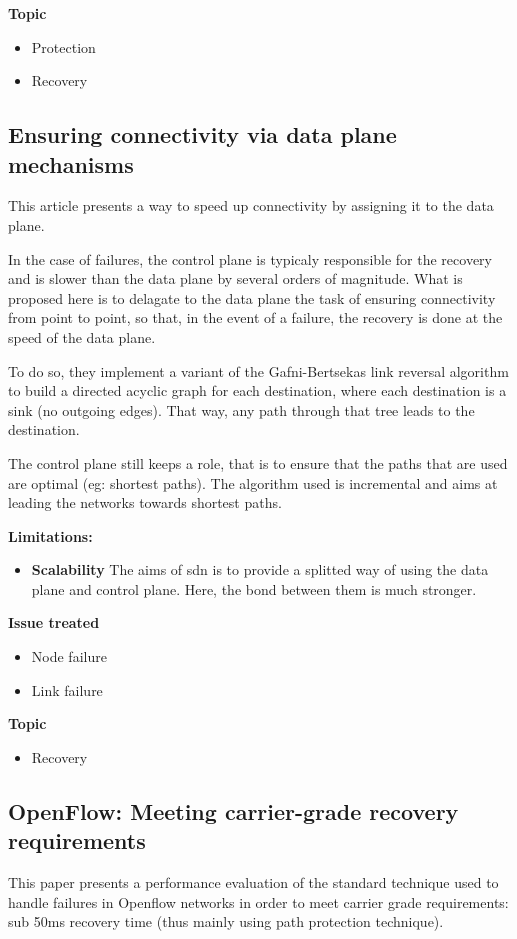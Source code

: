 \documentclass[compsoc]{IEEEtran}
\begin{document}
\textbf{Topic}
\begin{itemize}
	\item Protection
	\item Recovery
\end{itemize}

\subsection{Ensuring connectivity via data plane mechanisms \cite{Liu:2013:ECV:2482626.2482639}}
This article presents a way to speed up connectivity by assigning it to the data plane.

In the case of failures, the control plane is typicaly responsible for the recovery and is slower than the data plane by several orders of magnitude. What is proposed here is to delagate to the data plane the task of ensuring connectivity from point to point, so that, in the event of a failure, the recovery is done at the speed of the data plane.

To do so, they implement a variant of the Gafni-Bertsekas link reversal algorithm to build a directed acyclic graph for each destination, where each destination is a sink (no outgoing edges). That way, any path through that tree leads to the destination.

The control plane still keeps a role, that is to ensure that the paths that are used are optimal (eg: shortest paths). The algorithm used is incremental and aims at leading the networks towards shortest paths.

\textbf{Limitations:}
\begin{itemize}
	\item \textbf{Scalability} The aims of sdn is to provide a splitted way of using the data plane and control plane. Here, the bond between them is much stronger.
\end{itemize}

\textbf{Issue treated}
\begin{itemize}
	\item Node failure
	\item Link failure
\end{itemize}

\textbf{Topic}
\begin{itemize}
	\item Recovery
\end{itemize}

\subsection{OpenFlow: Meeting carrier-grade recovery requirements \cite{Sharma:2013:OMC:2445634.2445903}}
This paper presents a performance evaluation of the standard technique used to handle failures in Openflow networks in order to meet carrier grade requirements: sub 50ms recovery time (thus mainly using path protection technique).
\end{document}
